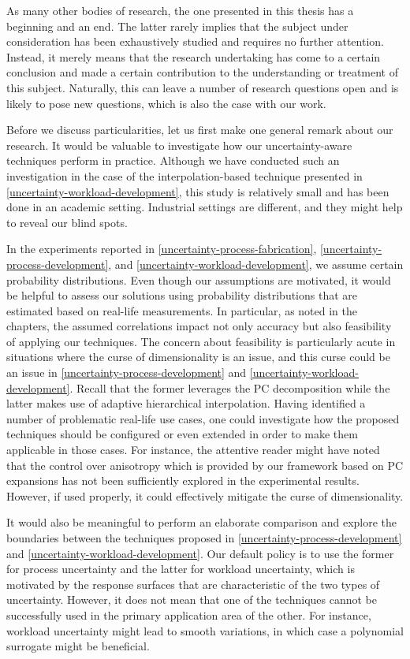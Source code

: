 As many other bodies of research, the one presented in this thesis has a
beginning and an end. The latter rarely implies that the subject under
consideration has been exhaustively studied and requires no further attention.
Instead, it merely means that the research undertaking has come to a certain
conclusion and made a certain contribution to the understanding or treatment of
this subject. Naturally, this can leave a number of research questions open and
is likely to pose new questions, which is also the case with our work.

Before we discuss particularities, let us first make one general remark about
our research. It would be valuable to investigate how our uncertainty-aware
techniques perform in practice. Although we have conducted such an investigation
in the case of the interpolation-based technique presented in
\cref{uncertainty-workload-development}, this study is relatively small and has
been done in an academic setting. Industrial settings are different, and they
might help to reveal our blind spots.

In the experiments reported in \cref{uncertainty-process-fabrication},
\cref{uncertainty-process-development}, and
\cref{uncertainty-workload-development}, we assume certain probability
distributions. Even though our assumptions are motivated, it would be helpful to
assess our solutions using probability distributions that are estimated based on
real-life measurements. In particular, as noted in the chapters, the assumed
correlations impact not only accuracy but also feasibility of applying our
techniques. The concern about feasibility is particularly acute in situations
where the curse of dimensionality is an issue, and this curse could be an issue
in \cref{uncertainty-process-development} and
\cref{uncertainty-workload-development}. Recall that the former leverages the
\ac{PC} decomposition while the latter makes use of adaptive hierarchical
interpolation. Having identified a number of problematic real-life use cases,
one could investigate how the proposed techniques should be configured or even
extended in order to make them applicable in those cases. For instance, the
attentive reader might have noted that the control over anisotropy which is
provided by our framework based on \ac{PC} expansions has not been sufficiently
explored in the experimental results. However, if used properly, it could
effectively mitigate the curse of dimensionality.

It would also be meaningful to perform an elaborate comparison and explore the
boundaries between the techniques proposed in
\cref{uncertainty-process-development} and
\cref{uncertainty-workload-development}. Our default policy is to use the former
for process uncertainty and the latter for workload uncertainty, which is
motivated by the response surfaces that are characteristic of the two types of
uncertainty. However, it does not mean that one of the techniques cannot be
successfully used in the primary application area of the other. For instance,
workload uncertainty might lead to smooth variations, in which case a polynomial
surrogate might be beneficial.

